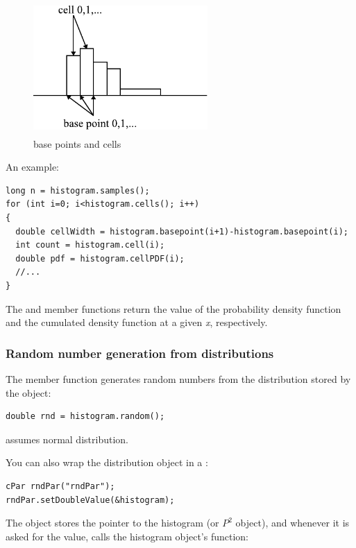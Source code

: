 \begin{figure}[htbp]
  \begin{center}
    \includegraphics[width=2.615in, height=2.001in]{figures/usmanFig14}
    \caption{base points and cells}
  \end{center}
\end{figure}

An example:

\begin{verbatim}
long n = histogram.samples();
for (int i=0; i<histogram.cells(); i++)
{
  double cellWidth = histogram.basepoint(i+1)-histogram.basepoint(i);
  int count = histogram.cell(i);
  double pdf = histogram.cellPDF(i);
  //...
}
\end{verbatim}


The  and  member functions
return the value of the probability density function and the cumulated
density function at a given \textit{x}, respectively.


\subsubsection{Random number generation from distributions}


The  member function generates random
numbers from the distribution stored by the
object:

\begin{verbatim}
double rnd = histogram.random();
\end{verbatim}


 assumes normal distribution.

You can also wrap the distribution object in a :

\begin{verbatim}
cPar rndPar("rndPar");
rndPar.setDoubleValue(&histogram);
\end{verbatim}


The  object stores the pointer to the histogram (or $P^{2}$ object),
and whenever it is asked for the value, calls the histogram object's 
function:


